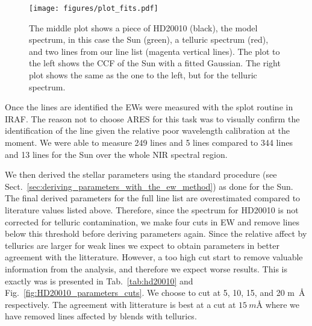 \documentclass{aa}
\begin{document}
\begin{figure}[tbp!]
    \centering
    \texttt{[image: figures/plot\_fits.pdf]}
    \caption{The middle plot shows a piece of HD20010 (black), the model
    spectrum, in this case the Sun (green), a telluric spectrum (red), and two
    lines from our line list (magenta vertical lines). The plot to the left
    shows the CCF of the Sun with a fitted Gaussian. The right plot shows the
    same as the one to the left, but for the telluric spectrum.}
    \label{fig:plot_fits}
\end{figure}

Once the lines are identified the EWs were measured with the splot
routine in IRAF. The reason not to choose ARES for this task was to
visually confirm the identification of the line given the relative
poor wavelength calibration at the moment. We were able to measure 249
 lines and 5  lines compared to 344 
lines and 13  lines for the Sun over the whole NIR spectral
region.

We then derived the stellar parameters using the standard procedure
(see Sect.~\ref{sec:deriving_parameters_with_the_ew_method}) as
done for the Sun. The final derived parameters for the full line
list are overestimated compared to literature values listed above.
Therefore, since the spectrum for HD20010 is not corrected for
telluric contamination, we make four cuts in EW and remove lines below
this threshold before deriving parameters again. Since the relative
affect by tellurics are larger for weak lines we expect to obtain
parameters in better agreement with the litterature. However, a too
high cut start to remove valuable information from the analysis, and
therefore we expect worse results. This is exactly was is presented in
Tab.~\ref{tab:hd20010} and Fig.~\ref{fig:HD20010_parameters_cuts}. We
choose to cut at 5, 10, 15, and 20 \si{m\angstrom} respectively. The
agreement with litterature is best at a cut at $\SI{15}{m\angstrom}$
where we have removed lines affected by blends with tellurics.
\end{document}
